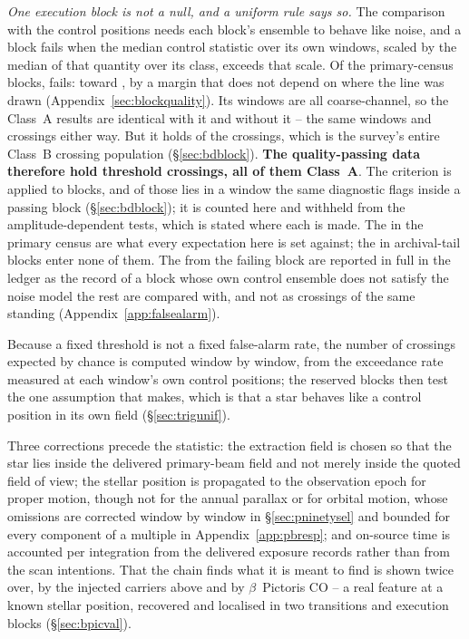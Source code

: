 \emph{One execution block is not a null, and a uniform rule says so.}
The comparison with the control positions needs each block's ensemble to behave
like noise, and a block fails when the median control statistic over its own
windows, scaled by the median of that quantity over its class, exceeds
\BqFactor{} that scale. Of the \BqNBlocks{} primary-census blocks, \BqNFail{} fails:
\BqFailBlock{} toward \BqFailStar, by a margin that does not depend on where
the line was drawn (Appendix~\ref{sec:blockquality}).
Its \BqFailNWin{} windows are all coarse-channel, so the Class~A
results are identical with it and without it -- the same \BqWinACut{} windows
and \BqXrossACut{} crossings either way. But it holds \BqFailNCross{} of the
\NCross{} crossings, which is the survey's entire Class~B crossing
population (\S\ref{sec:bdblock}). \textbf{The quality-passing data therefore hold
\EvNCrossQp{} threshold crossings, all of them Class~A}. The criterion is
applied to blocks, and \BkFlagNCrossOther{} of those \EvNCrossQp{} lies in a
window the same diagnostic flags inside a passing block
(\S\ref{sec:bdblock}); it is counted here and withheld from the
amplitude-dependent tests, which is stated where each is made. The
\CkNCrossCenA{} in the primary census are what every expectation here is set
against; the \CeNTailCrossWord{} in archival-tail blocks enter none of them.
The \BqFailNCross{} from the failing block are
reported in full in the ledger as the record of a block whose own control
ensemble does not satisfy the noise model the rest are compared with, and not
as crossings of the same standing (Appendix~\ref{app:falsealarm}).

Because a fixed threshold is not a fixed false-alarm rate, the number of
crossings expected by chance is computed window by window, from the
exceedance rate measured at each window's own control positions; the reserved
blocks then test the one assumption that makes, which is that a star behaves
like a control position in its own field (\S\ref{sec:trigunif}).

Three corrections precede the statistic: the extraction field is chosen so
that the star lies inside the delivered primary-beam field and not merely
inside the quoted field of view; the stellar position is propagated to the
observation epoch for proper motion, though not for the annual parallax or
for orbital motion, whose omissions are corrected window by window in
\S\ref{sec:pninetysel} and bounded for every component of a multiple in
Appendix~\ref{app:pbresp}; and on-source time is accounted per integration
from the
delivered exposure records rather than from the scan intentions. That the
chain finds what it is meant to find is shown twice over, by the injected
carriers above and by $\beta$~Pictoris CO -- a real feature at a known
stellar position, recovered and localised in two transitions and
\NStageOneBpicEb{} execution blocks (\S\ref{sec:bpicval}).

